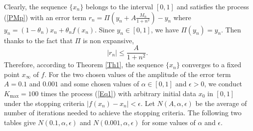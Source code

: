 \documentclass[11pt]{amsart}%
\theoremstyle{plain}
\numberwithin{equation}{section}
\begin{document}
Clearly, the sequence $\{x_n\}$ belongs to the interval  $[0,1]$ and satisfies the process (\ref{PMp}) with an error term $r_n=\Pi(y_n+A\frac{M_n}{1+n^2})-y_n$ where $y_n=(1-\theta_n)x_n+\theta_n f(x_n)$. Since $y_n\in[0,1]$, we have $\Pi(y_n)=y_n.$ Then thanks to the fact that $\Pi$ is non expansive,
\[
\left\vert r_n\right\vert\leq \frac{A}{1+n^2}.
\]
Therefore, according to Theorem \ref{Th1}, the sequence $\{x_n\}$ converges to a fixed point $x_{\infty}$ of $f$. For the two chosen values of the amplitude of the error term $A=0.1$ and $0.001$ and some chosen values of $\alpha \in [0,1]$ and $\epsilon>0$, we conduct $K_{\text{max}}=100$ times the process (\ref{Eq1}) with arbitrary initial data $x_0$ in $[0,1]$ under the stopping criteria $ \left\vert f(x_n)-x_n\right\vert<\epsilon$. Let $N(A,\alpha,\epsilon)$ be the average of number of iterations needed to achieve the stopping criteria. The following two tables give  $N(0.1, \alpha,\epsilon)$ and $N(0.001, \alpha,\epsilon)$  for some values of $\alpha$ and $\epsilon$.
\end{document}
